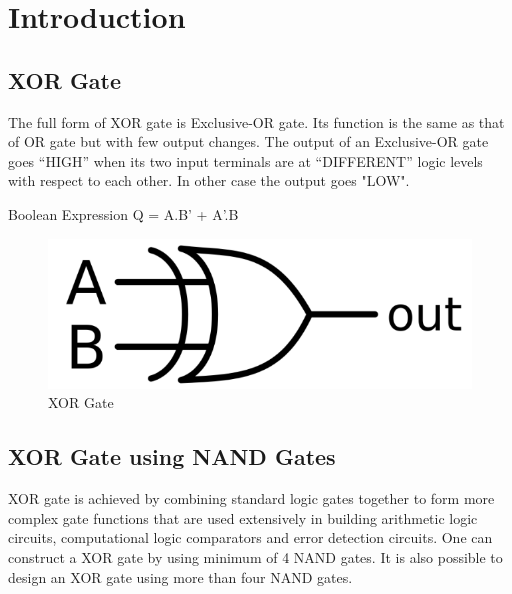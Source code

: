 \documentclass[10pt, a4paper]{article}
\title{\mytitle}
\author{\myauthor\hspace{1em}\\\contact\\\hspace{0.5em}\hspace{0.5em}\mymodule}
\date{}
\begin{document}
  \maketitle
\tableofcontents

\begin{abstract}
    This manual shows how to design 2-input XOR gate using 4 NAND gates.
\end{abstract}

\section{Introduction}
\subsection{XOR Gate}

   The full form of XOR gate is Exclusive-OR gate. Its function is the same as that of OR gate but with few output changes. The output of an Exclusive-OR gate goes “HIGH” when its two input terminals are at “DIFFERENT” logic levels with respect to each other. In other case the output goes "LOW".
        
         Boolean Expression Q = A.B' + A'.B 
\begin{figure}[H]
    \centering
    \includegraphics[scale=0.5]{XOR Gate.png}
    \caption{XOR Gate}
    \label{fig:XOR}
\end{figure}

\subsection{XOR Gate using NAND Gates}

XOR gate is achieved by combining standard logic gates together to form more complex gate functions that are used extensively in building arithmetic logic circuits, computational logic comparators and error detection circuits. One can construct a XOR gate by using minimum of 4 NAND gates. It is also possible to design an XOR gate using more than four NAND gates. 
\end{document}
